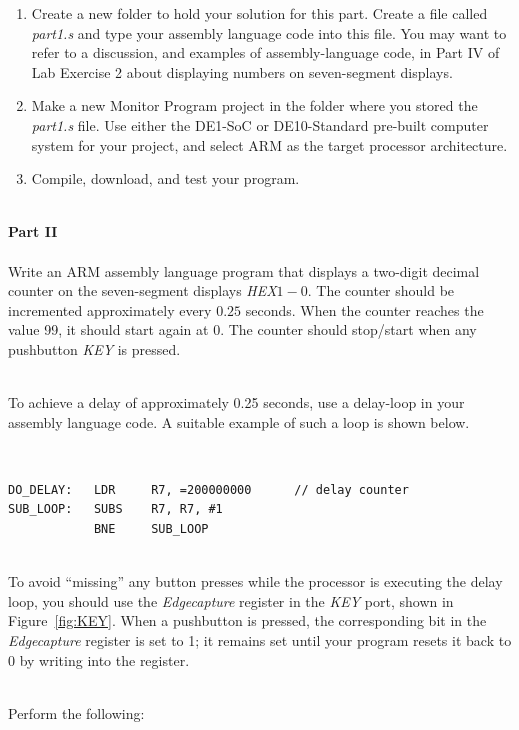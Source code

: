 \documentclass[epsfig,10pt,fullpage]{article}
\begin{document}
\begin{enumerate}
\item Create a new folder to hold your solution for this part. Create a
file called {\it part1.s} and type your assembly language code into this file.
You may want to refer to a discussion, and examples of assembly-language code,
in Part IV of Lab Exercise 2 about displaying numbers on seven-segment displays.

\item
Make a new Monitor Program project in the folder where you stored the {\it part1.s}
file. Use either the DE1-SoC or DE10-Standard pre-built computer system for your project, 
and select ARM as the target processor architecture.

\item
Compile, download, and test your program. 
\end{enumerate}

~\\
\noindent
{\bf Part II}
~\\
~\\
\noindent
Write an ARM assembly language program that displays a two-digit decimal counter on the 
seven-segment displays {\it HEX}$1-0$. The counter should be incremented approximately
every $0.25$ seconds. When the counter reaches the value 99, it should start again at 0.
The counter should stop/start when any pushbutton {\it KEY} is pressed.

~\\
\noindent
To achieve a delay of approximately 0.25 seconds, use a delay-loop in your assembly language
code. A suitable example of such a loop is shown below.

\noindent
~\\
\begin{lstlisting}[style=defaultArmStyle]
DO_DELAY: 	LDR 	R7, =200000000 		// delay counter
SUB_LOOP: 	SUBS 	R7, R7, #1
			BNE 	SUB_LOOP
\end{lstlisting}

~\\
\noindent
To avoid ``missing'' any button presses while the processor is executing the delay loop, you
should use the {\it Edgecapture} register in the {\it KEY} port, shown in Figure~\ref{fig:KEY}.
When a pushbutton is pressed, the corresponding bit in the {\it Edgecapture} register is
set to 1; it remains set until your program resets it back to 0 by writing into the register.

~\\
\noindent
Perform the following:
\end{document}
